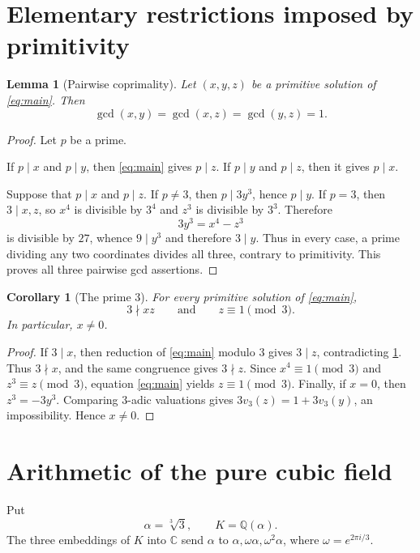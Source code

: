\documentclass[11pt,a4paper]{article}
\newtheorem{lemma}[lemma]{Lemma}
\newtheorem{corollary}[corollary]{Corollary}
\newcommand{\Q}{\mathbb Q}
\begin{document}
\section{Elementary restrictions imposed by primitivity}

\begin{lemma}[Pairwise coprimality]\label{lem:pairwise}
Let $(x,y,z)$ be a primitive solution of \eqref{eq:main}.  Then
\[
\gcd(x,y)=\gcd(x,z)=\gcd(y,z)=1.
\]
\end{lemma}

\begin{proof}
Let $p$ be a prime.

If $p\mid x$ and $p\mid y$, then \eqref{eq:main} gives $p\mid z$.
If $p\mid y$ and $p\mid z$, then it gives $p\mid x$.

Suppose that $p\mid x$ and $p\mid z$.  If $p\ne3$, then
$p\mid 3y^3$, hence $p\mid y$.  If $p=3$, then $3\mid x,z$, so
$x^4$ is divisible by $3^4$ and $z^3$ is divisible by $3^3$.  Therefore
\[
3y^3=x^4-z^3
\]
is divisible by $27$, whence $9\mid y^3$ and therefore $3\mid y$.
Thus in every case, a prime dividing any two coordinates divides all three,
contrary to primitivity.  This proves all three pairwise gcd assertions.
\end{proof}

\begin{corollary}[The prime $3$]\label{cor:three}
For every primitive solution of \eqref{eq:main},
\[
3\nmid xz
\qquad\text{and}\qquad
z\equiv1\pmod3.
\]
In particular, $x\ne0$.
\end{corollary}

\begin{proof}
If $3\mid x$, then reduction of \eqref{eq:main} modulo $3$ gives
$3\mid z$, contradicting \cref{lem:pairwise}.  Thus $3\nmid x$, and the
same congruence gives $3\nmid z$.  Since $x^4\equiv1\pmod3$ and
$z^3\equiv z\pmod3$, equation \eqref{eq:main} yields $z\equiv1\pmod3$.
Finally, if $x=0$, then $z^3=-3y^3$.  Comparing $3$-adic valuations gives
$3v_3(z)=1+3v_3(y)$, an impossibility.  Hence $x\ne0$.
\end{proof}

\section{Arithmetic of the pure cubic field}

Put
\[
\alpha=\sqrt[3]{3},
\qquad
K=\Q(\alpha).
\]
The three embeddings of $K$ into $\mathbb C$ send $\alpha$ to
$\alpha,\omega\alpha,\omega^2\alpha$, where
$\omega=e^{2\pi i/3}$.
\end{document}
